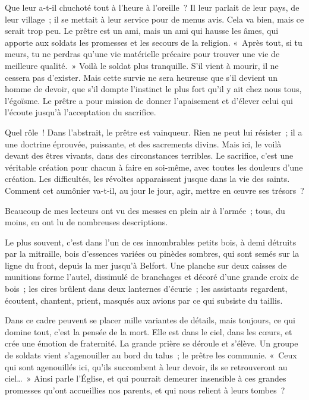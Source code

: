 \documentclass[french,twoside]{book} %
\begin{document}
\noindent Que leur a-t-il chuchoté tout à l’heure à l’oreille ? Il leur parlait de leur pays, de leur village ; il se mettait à leur service pour de menus avis. Cela va bien, mais ce serait trop peu. Le prêtre est un ami, mais un ami qui hausse les âmes, qui apporte aux soldats les promesses et les secours de la religion. « Après tout, si tu meurs, tu ne perdras qu’une vie matérielle précaire pour trouver une vie de meilleure qualité. » Voilà le soldat plus tranquille. S’il vient à mourir, il ne cessera pas d’exister. Mais cette survie ne sera heureuse que s’il devient un homme de devoir, que s’il dompte l’instinct le plus fort qu’il y ait chez nous tous, l’égoïsme. Le prêtre a pour mission de donner l’apaisement et d’élever celui qui l’écoute jusqu’à l’acceptation du sacrifice.‌\par
Quel rôle ! Dans l’abstrait, le prêtre est vainqueur. Rien ne peut lui résister ; il a une doctrine éprouvée, puissante, et des sacrements divins. Mais ici, le voilà devant des êtres vivants, dans des circonstances terribles. Le sacrifice, c’est une véritable création pour chacun à faire en soi-même, avec toutes les douleurs d’une création. Les difficultés, les révoltes apparaissent jusque dans la vie des saints. Comment cet aumônier va-t-il, au jour le jour, agir, mettre en œuvre ses trésors ?‌\par
Beaucoup de mes lecteurs ont vu des messes en plein air à l’armée ; tous, du moins, en ont lu de nombreuses descriptions.‌\par
Le plus souvent, c’est dans l’un de ces innombrables petits bois, à demi détruits par la mitraille, bois d’essences variées ou pinèdes sombres, qui sont semés sur la ligne du front, depuis la mer jusqu’à Belfort. Une planche sur deux caisses de munitions forme l’autel, dissimulé de branchages et décoré d’une grande croix de bois ; les cires brûlent dans deux lanternes d’écurie ; les assistants regardent, écoutent, chantent, prient, masqués aux avions par ce qui subsiste du taillis.‌\par
Dans ce cadre peuvent se placer mille variantes de détails, mais toujours, ce qui domine tout, c’est la pensée de la mort. Elle est dans le ciel, dans les cœurs, et crée une émotion de fraternité. La grande prière se déroule et s’élève. Un groupe de soldats vient s’agenouiller au bord du talus ; le prêtre les communie. « Ceux qui sont agenouillés ici, qu’ils succombent à leur devoir, ils se retrouveront au ciel… » Ainsi parle l’Église, et qui pourrait demeurer insensible à ces grandes promesses qu’ont accueillies nos parents, et qui nous relient à leurs tombes ?‌\par
\end{document}
